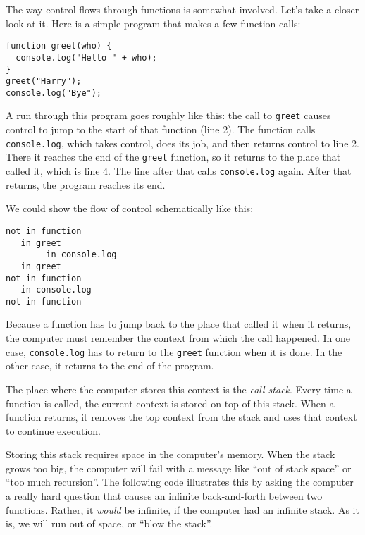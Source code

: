 The way control flows through functions is somewhat involved. Let's take a closer look at it. Here is a simple program that makes a few function calls:

\begin{lstlisting}
function greet(who) {
  console.log("Hello " + who);
}
greet("Harry");
console.log("Bye");
\end{lstlisting}
\noindent{}

A run through this program goes roughly like this: the call to \lstinline`greet` causes control to jump to the start of that function (line 2). The function calls \lstinline`console.log`, which takes control, does its job, and then returns control to line 2. There it reaches the end of the \lstinline`greet` function, so it returns to the place that called it, which is line 4. The line after that calls \lstinline`console.log` again. After that returns, the program reaches its end.

We could show the flow of control schematically like this:

\begin{lstlisting}
not in function
   in greet
        in console.log
   in greet
not in function
   in console.log
not in function
\end{lstlisting}
\noindent{}

Because a function has to jump back to the place that called it when it returns, the computer must remember the context from which the call happened. In one case, \lstinline`console.log` has to return to the \lstinline`greet` function when it is done. In the other case, it returns to the end of the program.

The place where the computer stores this context is the \emph{call
stack}. Every time a function is called, the current context is stored on top of this stack. When a function returns, it removes the top context from the stack and uses that context to continue execution.

Storing this stack requires space in the computer's memory. When the stack grows too big, the computer will fail with a message like ``out of stack space'' or ``too much recursion''. The following code illustrates this by asking the computer a really hard question that causes an infinite back-and-forth between two functions. Rather, it \emph{would} be infinite, if the computer had an infinite stack. As it is, we will run out of space, or ``blow the stack''.

